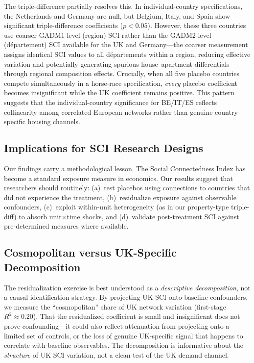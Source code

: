 \documentclass[12pt]{article}
\begin{document}
The triple-difference partially resolves this. In individual-country specifications, the Netherlands and Germany are null, but Belgium, Italy, and Spain show significant triple-difference coefficients ($p < 0.05$). However, these three countries use coarser GADM1-level (region) SCI rather than the GADM2-level (d\'epartement) SCI available for the UK and Germany---the coarser measurement assigns identical SCI values to all d\'epartements within a region, reducing effective variation and potentially generating spurious house--apartment differentials through regional composition effects. Crucially, when all five placebo countries compete simultaneously in a horse-race specification, \textit{every} placebo coefficient becomes insignificant while the UK coefficient remains positive. This pattern suggests that the individual-country significance for BE/IT/ES reflects collinearity among correlated European networks rather than genuine country-specific housing channels.

\subsection{Implications for SCI Research Designs}

Our findings carry a methodological lesson. The Social Connectedness Index has become a standard exposure measure in economics. Our results suggest that researchers should routinely: (a)~test placebos using connections to countries that did not experience the treatment, (b)~residualize exposure against observable confounders, (c)~exploit within-unit heterogeneity (as in our property-type triple-diff) to absorb unit$\times$time shocks, and (d)~validate post-treatment SCI against pre-determined measures where available.

\subsection{Cosmopolitan versus UK-Specific Decomposition}

The residualization exercise is best understood as a \textit{descriptive decomposition}, not a causal identification strategy. By projecting UK SCI onto baseline confounders, we measure the ``cosmopolitan'' share of UK network variation (first-stage $R^2 \approx 0.20$). That the residualized coefficient is small and insignificant does not prove confounding---it could also reflect attenuation from projecting onto a limited set of controls, or the loss of genuine UK-specific signal that happens to correlate with baseline observables. The decomposition is informative about the \textit{structure} of UK SCI variation, not a clean test of the UK demand channel.
\end{document}
